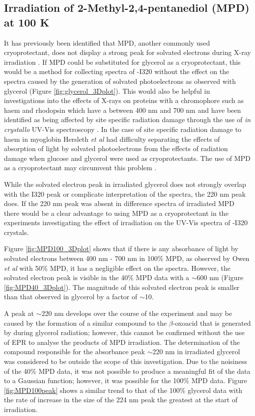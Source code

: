 \subsection{Irradiation of 2-Methyl-2,4-pentanediol (MPD) at 100 K}

It has previously been identified that MPD, another commonly used cryoprotectant, does not display a strong peak for solvated electrons during X-ray irradiation \cite{McGeehan2009,Owen2011}. If MPD could be substituted for glycerol as a cryoprotectant, this would be a method for collecting spectra of \atpdx -I320 without the effect on the spectra caused by the generation of solvated photoelectrons as observed with glycerol (Figure \ref{fig:glycerol_3Dplot}). This would also be helpful in investigations into the effects of X-rays on proteins with a chromophore such as haem and rhodopsin which have a \lwl between 400 nm and 700 nm and have been identified as being affected by site specific radiation damage through the use of \textit{in crystallo} UV-Vis spectroscopy \cite{Borshchevskiy2011,Hersleth2011}. In the case of site specific radiation damage to haem in myoglobin Hersleth \textit{et al} had difficulty separating the effects of absorption of light by solvated photoelectrons from the effects of radiation damage when glucose and glycerol were used as cryoprotectants. The use of MPD as a cryoprotectant may circumvent this problem \cite{Hersleth2011}.

While the solvated electron peak in irradiated glycerol does not strongly overlap with the I320 peak or complicate interpretation of the spectra, the 220 nm peak does. If the 220 nm peak was absent in difference spectra of irradiated MPD there would be a clear advantage to using MPD as a cryoprotectant in the experiments investigating the effect of irradiation on the UV-Vis spectra of \atpdx -I320 crystals.   

Figure \ref{fig:MPD100_3Dplot} shows that if there is any absorbance of light by solvated electrons between 400 \si{\nano\meter} - 700 \si{\nano\meter} in 100\% MPD, as observed by Owen \textit{et al} with 50\% MPD, it has a negligible effect on the spectra. However, the solvated electron peak is visible in the 40\% MPD data with a \lwl $\sim$600 nm (Figure  \ref{fig:MPD40_3Dplot}). The magnitude of this solvated electron peak is smaller than that observed in glycerol by a factor of $\sim$10.  

A peak at $\sim$220 nm develops over the course of the experiment and may be caused by the formation of a similar compound to the $\beta$-oxoacid that is generated by during glycerol radiation; however, this cannot be confirmed without the use of EPR to analyse the products of MPD irradiation. The determination of the compound responsible for the absorbance peak $\sim$220 nm in irradiated glycerol was considered to be outside the scope of this investigation. Due to the noisiness of the 40\% MPD data, it was not possible to produce a meaningful fit of the data to a Gaussian function; however, it was possible for the 100\% MPD data. Figure \ref{fig:MPD100peak} shows a similar trend to that of the 100\% glycerol data with the rate of increase in the size of the 224 nm peak the greatest at the start of irradiation.


